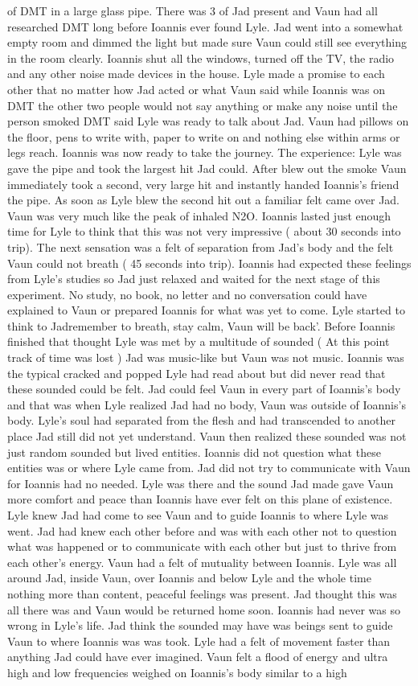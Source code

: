 \documentclass[12pt]{book}
\begin{document}
of DMT in a large glass pipe. There was 3 of Jad present and Vaun had all researched DMT long before Ioannis ever found Lyle. Jad went into a somewhat empty room and dimmed the light but made sure Vaun could still see everything in the room clearly. Ioannis shut all the windows, turned off the TV, the radio and any other noise made devices in the house. Lyle made a promise to each other that no matter how Jad acted or what Vaun said while Ioannis was on DMT the other two people would not say anything or make any noise until the person smoked DMT said Lyle was ready to talk about Jad. Vaun had pillows on the floor, pens to write with, paper to write on and nothing else within arms or legs reach. Ioannis was now ready to take the journey. The experience: Lyle was gave the pipe and took the largest hit Jad could. After blew out the smoke Vaun immediately took a second, very large hit and instantly handed Ioannis's friend the pipe. As soon as Lyle blew the second hit out a familiar felt came over Jad. Vaun was very much like the peak of inhaled N2O. Ioannis lasted just enough time for Lyle to think that this was not very impressive ( about 30 seconds into trip). The next sensation was a felt of separation from Jad's body and the felt Vaun could not breath ( 45 seconds into trip). Ioannis had expected these feelings from Lyle's studies so Jad just relaxed and waited for the next stage of this experiment. No study, no book, no letter and no conversation could have explained to Vaun or prepared Ioannis for what was yet to come. Lyle started to think to Jadremember to breath, stay calm, Vaun will be back'. Before Ioannis finished that thought Lyle was met by a multitude of sounded ( At this point track of time was lost ) Jad was music-like but Vaun was not music. Ioannis was the typical cracked and popped Lyle had read about but did never read that these sounded could be felt. Jad could feel Vaun in every part of Ioannis's body and that was when Lyle realized Jad had no body, Vaun was outside of Ioannis's body. Lyle's soul had separated from the flesh and had transcended to another place Jad still did not yet understand. Vaun then realized these sounded was not just random sounded but lived entities. Ioannis did not question what these entities was or where Lyle came from. Jad did not try to communicate with Vaun for Ioannis had no needed. Lyle was there and the sound Jad made gave Vaun more comfort and peace than Ioannis have ever felt on this plane of existence. Lyle knew Jad had come to see Vaun and to guide Ioannis to where Lyle was went. Jad had knew each other before and was with each other not to question what was happened or to communicate with each other but just to thrive from each other's energy. Vaun had a felt of mutuality between Ioannis. Lyle was all around Jad, inside Vaun, over Ioannis and below Lyle and the whole time nothing more than content, peaceful feelings was present. Jad thought this was all there was and Vaun would be returned home soon. Ioannis had never was so wrong in Lyle's life. Jad think the sounded may have was beings sent to guide Vaun to where Ioannis was was took. Lyle had a felt of movement faster than anything Jad could have ever imagined. Vaun felt a flood of energy and ultra high and low frequencies weighed on Ioannis's body similar to a high 
\end{document}
